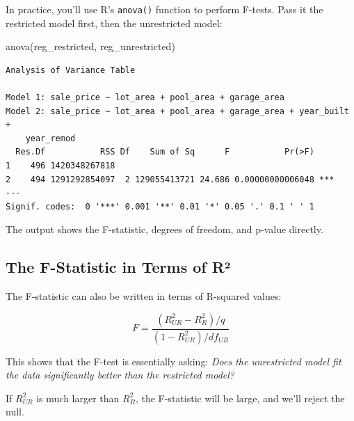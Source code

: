\documentclass[
  letterpaper,
  DIV=11,
  numbers=noendperiod]{scrreprt}
\newenvironment{Shaded}{\begin{snugshade}}{\end{snugshade}}
\newcommand{\FunctionTok}[1]{\textcolor[rgb]{0.28,0.35,0.67}{#1}}
\newcommand{\NormalTok}[1]{\textcolor[rgb]{0.00,0.23,0.31}{#1}}
\begin{document}
In practice, you'll use R's \texttt{anova()} function to perform
F-tests. Pass it the restricted model first, then the unrestricted
model:

\begin{Shaded}
\begin{Highlighting}[]
\FunctionTok{anova}\NormalTok{(reg\_restricted, reg\_unrestricted)}
\end{Highlighting}
\end{Shaded}

\begin{verbatim}
Analysis of Variance Table

Model 1: sale_price ~ lot_area + pool_area + garage_area
Model 2: sale_price ~ lot_area + pool_area + garage_area + year_built + 
    year_remod
  Res.Df           RSS Df    Sum of Sq      F           Pr(>F)    
1    496 1420348267818                                            
2    494 1291292854097  2 129055413721 24.686 0.00000000006048 ***
---
Signif. codes:  0 '***' 0.001 '**' 0.01 '*' 0.05 '.' 0.1 ' ' 1
\end{verbatim}

The output shows the F-statistic, degrees of freedom, and p-value
directly.

\subsection{The F-Statistic in Terms of
R²}\label{the-f-statistic-in-terms-of-ruxb2}

The F-statistic can also be written in terms of R-squared values:

\[F = \frac{(R^2_{UR} - R^2_R)/q}{(1 - R^2_{UR})/df_{UR}}\]

This shows that the F-test is essentially asking: \emph{Does the
unrestricted model fit the data significantly better than the restricted
model?}

If \(R^2_{UR}\) is much larger than \(R^2_R\), the F-statistic will be
large, and we'll reject the null.
\end{document}

